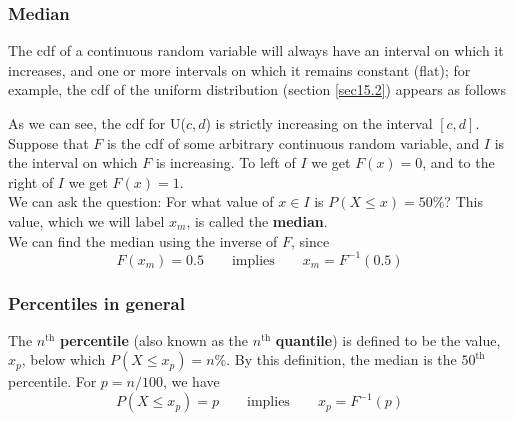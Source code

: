 \subsubsection{Median}
\noindent The cdf of a continuous random variable will always have an interval on which it increases, and one or more intervals on which it remains constant (flat); for example, the cdf of the uniform distribution (section \ref{sec15.2}) appears as follows
\begin{center}
\end{center}
As we can see, the cdf for U($c,d$) is strictly increasing on the interval $[c,d].$ Suppose that $F$ is the cdf of some arbitrary continuous random variable, and $I$ is the interval on which $F$ is increasing. To left of $I$ we get $F(x) = 0$, and to the right of $I$ we get $F(x) = 1$. \\

\noindent We can ask the question: For what value of $x \in I$ is $P(X \leq x) = 50\%$? This value, which we will label $x_m$, is called the \textbf{median}. \label{median} \\

\noindent We can find the median using the inverse of $F$, since
\[
F(x_m) = 0.5 \qquad \text{implies} \qquad x_m = F^{-1}(0.5)
\]

\subsubsection{Percentiles in general}
The $n^\text{th}$ \textbf{percentile} (also known as the $n^\text{th}$ \textbf{quantile}) is defined to be the value, $x_p$, below which $P(X \leq x_p) = n\%.$ By this definition, the median is the $50^\text{th}$ percentile. For $p = n/100$, we have
\[
P(X \leq x_p) = p \qquad \text{implies} \qquad x_p = F^{-1}(p)
\]

